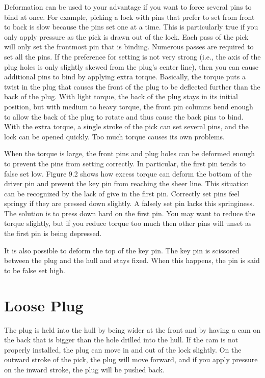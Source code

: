 Deformation can be used to your advantage if you want to force several pins to bind at
once. For example, picking a lock with pins that prefer to set from front to back is slow
because the pins set one at a time. This is particularly true if you only apply pressure as
the pick is drawn out of the lock. Each pass of the pick will only set the frontmost pin that
is binding. Numerous passes are required to set all the pins. If the preference for setting is
not very strong (i.e., the axis of the plug holes is only slightly skewed from the plug's center
line), then you can cause additional pins to bind by applying extra torque. Basically, the
torque puts a twist in the plug that causes the front of the plug to be deflected further than
the back of the plug. With light torque, the back of the plug stays in its initial position, but
with medium to heavy torque, the front pin columns bend enough to allow the back of the
plug to rotate and thus cause the back pins to bind. With the extra torque, a single stroke
of the pick can set several pins, and the lock can be opened quickly. Too much torque causes
its own problems.

When the torque is large, the front pins and plug holes can be deformed enough to prevent
the pins from setting correctly. In particular, the first pin tends to false set low. Figure 9.2
shows how excess torque can deform the bottom of the driver pin and prevent the key pin
from reaching the sheer line. This situation can be recognized by the lack of give in the
first pin. Correctly set pins feel springy if they are pressed down slightly. A falsely set pin
lacks this springiness. The solution is to press down hard on the first pin. You may want to
reduce the torque slightly, but if you reduce torque too much then other pins will unset as
the first pin is being depressed.

It is also possible to deform the top of the key pin. The key pin is scissored between the
plug and the hull and stays fixed. When this happens, the pin is said to be false set high.

\section{Loose Plug }
The plug is held into the hull by being wider at the front and by having a cam on the back
that is bigger than the hole drilled into the hull. If the cam is not properly installed, the
plug can move in and out of the lock slightly. On the outward stroke of the pick, the plug
will move forward, and if you apply pressure on the inward stroke, the plug will be pushed
back.

